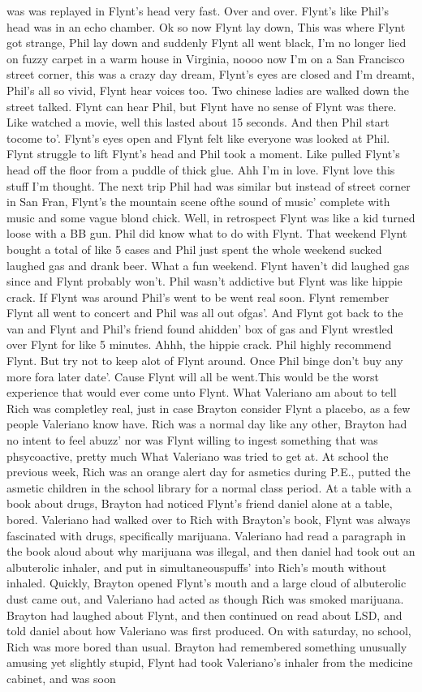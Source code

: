 \documentclass[12pt]{book}
\begin{document}
was was replayed in Flynt's head very fast. Over and over. Flynt's like Phil's head was in an echo chamber. Ok so now Flynt lay down, This was where Flynt got strange, Phil lay down and suddenly Flynt all went black, I'm no longer lied on fuzzy carpet in a warm house in Virginia, noooo now I'm on a San Francisco street corner, this was a crazy day dream, Flynt's eyes are closed and I'm dreamt, Phil's all so vivid, Flynt hear voices too. Two chinese ladies are walked down the street talked. Flynt can hear Phil, but Flynt have no sense of Flynt was there. Like watched a movie, well this lasted about 15 seconds. And then Phil start tocome to'. Flynt's eyes open and Flynt felt like everyone was looked at Phil. Flynt struggle to lift Flynt's head and Phil took a moment. Like pulled Flynt's head off the floor from a puddle of thick glue. Ahh I'm in love. Flynt love this stuff I'm thought. The next trip Phil had was similar but instead of street corner in San Fran, Flynt's the mountain scene ofthe sound of music' complete with music and some vague blond chick. Well, in retrospect Flynt was like a kid turned loose with a BB gun. Phil did know what to do with Flynt. That weekend Flynt bought a total of like 5 cases and Phil just spent the whole weekend sucked laughed gas and drank beer. What a fun weekend. Flynt haven't did laughed gas since and Flynt probably won't. Phil wasn't addictive but Flynt was like hippie crack. If Flynt was around Phil's went to be went real soon. Flynt remember Flynt all went to concert and Phil was all out ofgas'. And Flynt got back to the van and Flynt and Phil's friend found ahidden' box of gas and Flynt wrestled over Flynt for like 5 minutes. Ahhh, the hippie crack. Phil highly recommend Flynt. But try not to keep alot of Flynt around. Once Phil binge don't buy any more fora later date'. Cause Flynt will all be went.This would be the worst experience that would ever come unto Flynt. What Valeriano am about to tell Rich was completley real, just in case Brayton consider Flynt a placebo, as a few people Valeriano know have. Rich was a normal day like any other, Brayton had no intent to feel abuzz' nor was Flynt willing to ingest something that was phsycoactive, pretty much What Valeriano was tried to get at. At school the previous week, Rich was an orange alert day for asmetics during P.E., putted the asmetic children in the school library for a normal class period. At a table with a book about drugs, Brayton had noticed Flynt's friend daniel alone at a table, bored. Valeriano had walked over to Rich with Brayton's book, Flynt was always fascinated with drugs, specifically marijuana. Valeriano had read a paragraph in the book aloud about why marijuana was illegal, and then daniel had took out an albuterolic inhaler, and put in simultaneouspuffs' into Rich's mouth without inhaled. Quickly, Brayton opened Flynt's mouth and a large cloud of albuterolic dust came out, and Valeriano had acted as though Rich was smoked marijuana. Brayton had laughed about Flynt, and then continued on read about LSD, and told daniel about how Valeriano was first produced. On with saturday, no school, Rich was more bored than usual. Brayton had remembered something unusually amusing yet slightly stupid, Flynt had took Valeriano's inhaler from the medicine cabinet, and was soon 
\end{document}

